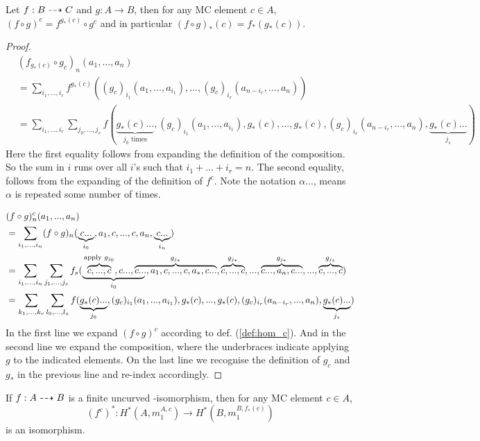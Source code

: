 \begin{lemma}
Let $f: B \dashrightarrow C$ and $g: A \to B$, then for any MC element $c \in A$, 
$(f\circ g)^c = f^{g_*(c)} \circ g^c$ and in particular 
$(f \circ g)_* (c) = f_*(g_*(c))$.
\end{lemma}

\begin{proof}
\begin{align*}
&(f_{g_*(c)} \circ g_c)_n (a_1, ..., a_n) \\
&= \sum_{i_1,...,i_r} f^{g_*(c)} ((g_c)_{i_1}(a_1,...,a_{i_1}), ...,
(g_c)_{i_r}(a_{n-i_r},...,a_n)) \\
&= \sum_{i_1,...,i_r}\sum_{j_0,...,j_s} 
f (\underbrace{g_*(c)...}_{j_0 \text{ times}},(g_c)_{i_1}(a_1,...,a_{i_1}), 
g_*(c),...,g_*(c), (g_c)_{i_r}(a_{n-i_r},...,a_n), 
\underbrace{g_*(c)...}_{j_s}) 
\end{align*}
Here the first equality follows from expanding the definition of the
composition. So the sum in $i$ runs over all $i$'s such that $i_1+...+i_r = n$.
The second equality, follows from the expanding of the definition of $f^c$.
Note the notation $\alpha...$, means $\alpha$ is repeated some number of times.

\begin{align*}
&(f \circ g)^c_n (a_1, ..., a_n) \\
&= \sum_{i_1,...,i_n} (f \circ g)_n (\underbrace{c...}_{i_0},a_1,c,...,c,a_n,
\underbrace{c...}_{i_n}) \\
&= \sum_{i_1,...,i_n}\sum_{j_1,...,j_s} 
f_s(
\lefteqn{\underbrace{\phantom{\overbrace{c,...,c}^{\text{apply }g_{j_0}},c...,
c...}}_{i_0}} 
\overbrace{c,...,c}^{\text{apply }g_{j_0}},c..., 
\overbrace{c...,a_1,c,...,c,a_*,c...}^{g_{j_*}}, 
\overbrace{c,...,c}^{g_{j_{*}}}, ... , 
\overbrace{c...,a_n,c...}^{g_{j_*}},..., 
\overbrace{c,...,c}^{g_{j_s}} ) \\
&= \sum_{k_1,...,k_r}\sum_{l_0,...,l_s} 
f (\underbrace{g_*(c)...}_{j_0},(g_c)_{i_1}(a_1,...,a_{i_1}), 
g_*(c),...,g_*(c), (g_c)_{i_r}(a_{n-i_r},...,a_n), 
\underbrace{g_*(c)...}_{j_s}) 
\end{align*}
In the first line we expand $(f\circ g)^c$ according to def. (\ref{def:hom_c}).
And in the second line we expand the composition, where the underbraces indicate
applying $g$ to the indicated elements. On the last line we recognise the
definition of $g_c$ and $g_*$ in the previous line and re-index accordingly.
\end{proof}

\begin{corol}
If $f: A \dashrightarrow B$ is a finite uncurved \Ainf-isomorphism, 
then for any MC element $c \in A$, 
%
\[ (f^c)^*: H^*(A, m_1^{A,c}) \to H^*(B, m_1^{B,f_*(c)}) \]
is an isomorphism.
\end{corol}

